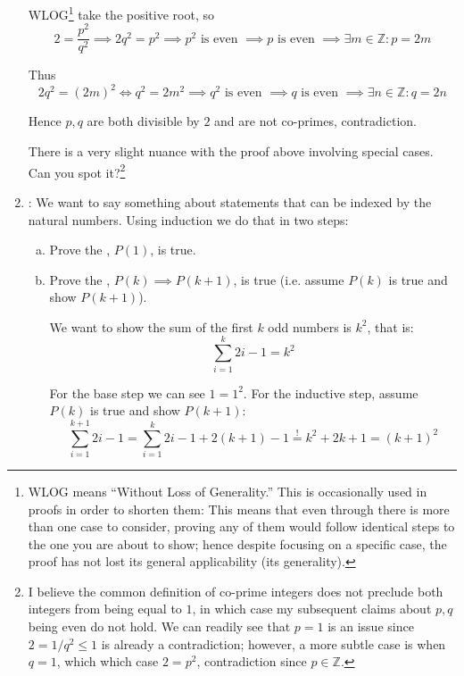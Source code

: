 \documentclass{article}
\begin{document}
\begin{enumerate}
\begin{example}
      WLOG\footnote{WLOG means ``Without Loss of Generality.'' This is occasionally used in proofs in order to shorten them: This means that even through there is more than one case to consider, proving any of them would follow identical steps to the one you are about to show; hence despite focusing on a specific case, the proof has not lost its general applicability (its generality).} take the positive root, so
      \[
        2 = \dfrac{p^2}{q^2}
        \implies
        2q^2 = p^2
        \implies
        p^2 \text{ is even }
        \implies
        p \text{ is even }
        \implies
        \exists m \in \mathbb{Z}: p = 2m
      \]

      Thus
      \[
        2q^2 = (2m)^2
        \iff
        q^2 = 2m^2
        \implies
        q^2 \text{ is even }
        \implies
        q \text{ is even }
        \implies
        \exists n \in \mathbb{Z}: q = 2n
      \]

      Hence $p, q$ are both divisible by $2$ and are not co-primes, contradiction.
    \end{example}

    There is a very slight nuance with the proof above involving special cases. Can you spot it?\footnote{I believe the common definition of co-prime integers does not preclude both integers from being equal to $1$, in which case my subsequent claims about $p, q$ being even do not hold. We can readily see that $p = 1$ is an issue since $2 = 1/q^2 \le 1$ is already a contradiction; however, a more subtle case is when $q = 1$, which which case $2 = p^2$, contradiction since $p \in \mathbb{Z}$.}

  \item {}: We want to say something about statements that can be indexed by the natural numbers. Using induction we do that in two steps:
    \begin{enumerate}[a)]
      \item Prove the , $P(1)$, is true.

      \item Prove the , $P(k) \implies P(k + 1)$, is true (i.e. assume $P(k)$ is true and show $P(k + 1)$).
        \begin{example}
          We want to show the sum of the first $k$ odd numbers is $k^2$, that is:
          \[
            \sum^{k}_{i = 1} 2i - 1 = k^2
          \]

          For the base step we can see $1 = 1^2$. For the inductive step, assume $P(k)$ is true and show $P(k + 1)$:
          \[
            \sum^{k + 1}_{i = 1} 2i - 1
            =
            \sum^{k}_{i = 1} 2i - 1
            +
            2(k + 1) - 1
            \stackrel{!}{=}
            k^2
            +
            2k
            +
            1
            =
            (k +  1)^2
          \]


\end{example}
\end{enumerate}
\end{enumerate}
\end{document}
